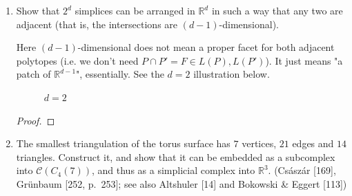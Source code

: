\documentclass{article}
\begin{document}
\begin{enumerate}
\begin{solution}
\begin{remark}
\begin{figure}[h]
    \centering
{}

\caption{The Hexagon 2-Face of Richter-Gebert's 4-Polytope}
\end{figure}
\end{remark}
\end{solution}

\item Show that $2^d$ simplices can be arranged in $\mathbb{R}^d$ in such a way that any two are adjacent (that is, the intersections are $(d-1)$-dimensional).

\begin{remark}
    Here $(d-1)$-dimensional does not mean a proper facet for both adjacent polytopes (i.e. we don't need $P \cap P' = F \in L(P), L(P')$). It just means "a patch of $\mathbb{R}^{d-1}$", essentially. See the $d=2$ illustration below.
\end{remark}

\begin{figure}[h]
    \centering
{}

    \caption{$d=2$}
\end{figure}

\begin{proof}
\end{proof}


\item The smallest triangulation of the torus surface has $7$ vertices, $21$ edges and $14$ triangles. Construct it, and show that it can be embedded as a subcomplex into $\mathcal C(C_4(7))$, and thus as a simplicial complex into $\mathbb{R}^3$.
(Cs\'asz\'ar [169], Gr\"unbaum [252, p.~253]; see also Altshuler [14] and Bokowski \& Eggert [113])


\end{enumerate}
\end{document}
